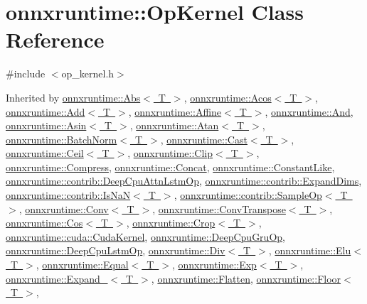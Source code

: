 \hypertarget{classonnxruntime_1_1OpKernel}{}\section{onnxruntime\+:\+:Op\+Kernel Class Reference}
\label{classonnxruntime_1_1OpKernel}


{\ttfamily \#include $<$op\+\_\+kernel.\+h$>$}



Inherited by \mbox{\hyperlink{classonnxruntime_1_1Abs}{onnxruntime\+::\+Abs$<$ T $>$}}, \mbox{\hyperlink{classonnxruntime_1_1Acos}{onnxruntime\+::\+Acos$<$ T $>$}}, \mbox{\hyperlink{classonnxruntime_1_1Add}{onnxruntime\+::\+Add$<$ T $>$}}, \mbox{\hyperlink{classonnxruntime_1_1Affine}{onnxruntime\+::\+Affine$<$ T $>$}}, \mbox{\hyperlink{classonnxruntime_1_1And}{onnxruntime\+::\+And}}, \mbox{\hyperlink{classonnxruntime_1_1Asin}{onnxruntime\+::\+Asin$<$ T $>$}}, \mbox{\hyperlink{classonnxruntime_1_1Atan}{onnxruntime\+::\+Atan$<$ T $>$}}, \mbox{\hyperlink{classonnxruntime_1_1BatchNorm}{onnxruntime\+::\+Batch\+Norm$<$ T $>$}}, \mbox{\hyperlink{classonnxruntime_1_1Cast}{onnxruntime\+::\+Cast$<$ T $>$}}, \mbox{\hyperlink{classonnxruntime_1_1Ceil}{onnxruntime\+::\+Ceil$<$ T $>$}}, \mbox{\hyperlink{classonnxruntime_1_1Clip}{onnxruntime\+::\+Clip$<$ T $>$}}, \mbox{\hyperlink{classonnxruntime_1_1Compress}{onnxruntime\+::\+Compress}}, \mbox{\hyperlink{classonnxruntime_1_1Concat}{onnxruntime\+::\+Concat}}, \mbox{\hyperlink{classonnxruntime_1_1ConstantLike}{onnxruntime\+::\+Constant\+Like}}, \mbox{\hyperlink{classonnxruntime_1_1contrib_1_1DeepCpuAttnLstmOp}{onnxruntime\+::contrib\+::\+Deep\+Cpu\+Attn\+Lstm\+Op}}, \mbox{\hyperlink{classonnxruntime_1_1contrib_1_1ExpandDims}{onnxruntime\+::contrib\+::\+Expand\+Dims}}, \mbox{\hyperlink{classonnxruntime_1_1contrib_1_1IsNaN}{onnxruntime\+::contrib\+::\+Is\+Na\+N$<$ T $>$}}, \mbox{\hyperlink{classonnxruntime_1_1contrib_1_1SampleOp}{onnxruntime\+::contrib\+::\+Sample\+Op$<$ T $>$}}, \mbox{\hyperlink{classonnxruntime_1_1Conv}{onnxruntime\+::\+Conv$<$ T $>$}}, \mbox{\hyperlink{classonnxruntime_1_1ConvTranspose}{onnxruntime\+::\+Conv\+Transpose$<$ T $>$}}, \mbox{\hyperlink{classonnxruntime_1_1Cos}{onnxruntime\+::\+Cos$<$ T $>$}}, \mbox{\hyperlink{classonnxruntime_1_1Crop}{onnxruntime\+::\+Crop$<$ T $>$}}, \mbox{\hyperlink{classonnxruntime_1_1cuda_1_1CudaKernel}{onnxruntime\+::cuda\+::\+Cuda\+Kernel}}, \mbox{\hyperlink{classonnxruntime_1_1DeepCpuGruOp}{onnxruntime\+::\+Deep\+Cpu\+Gru\+Op}}, \mbox{\hyperlink{classonnxruntime_1_1DeepCpuLstmOp}{onnxruntime\+::\+Deep\+Cpu\+Lstm\+Op}}, \mbox{\hyperlink{classonnxruntime_1_1Div}{onnxruntime\+::\+Div$<$ T $>$}}, \mbox{\hyperlink{classonnxruntime_1_1Elu}{onnxruntime\+::\+Elu$<$ T $>$}}, \mbox{\hyperlink{classonnxruntime_1_1Equal}{onnxruntime\+::\+Equal$<$ T $>$}}, \mbox{\hyperlink{classonnxruntime_1_1Exp}{onnxruntime\+::\+Exp$<$ T $>$}}, \mbox{\hyperlink{classonnxruntime_1_1Expand__8}{onnxruntime\+::\+Expand\+\_$<$ T $>$}}, \mbox{\hyperlink{classonnxruntime_1_1Flatten}{onnxruntime\+::\+Flatten}}, \mbox{\hyperlink{classonnxruntime_1_1Floor}{onnxruntime\+::\+Floor$<$ T $>$}}, 